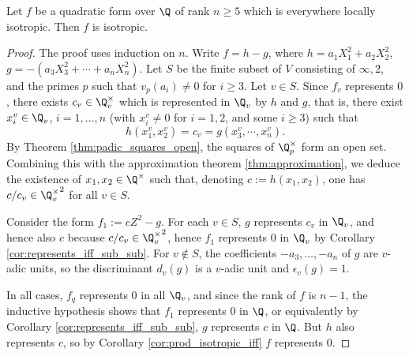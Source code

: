\begin{lemma}\label{lem:isotr_of_five_le_rk}
\leanok
Let $f$ be a quadratic form over $\Q$ of rank $n \ge 5$ which is everywhere locally isotropic. Then $f$ is isotropic.
\end{lemma}
\begin{proof}
The proof uses induction on $n$. Write $f = h - g$, where $h = a_1X_1^2 + a_2X_2^2$, $g = -(a_3X_3^2 + \cdots + a_nX_n^2)$.
Let $S$ be the finite subset of $V$ consisting of $\infty, 2$, and the primes $p$ such that $v_p(a_i) \ne 0$ for $i \ge 3$.
Let $v \in S$. Since $f_v$ represents $0$, there exists $c_v \in \Q_v^\times$ which is represented in $\Q_v$ by $h$ and $g$, that is, there exist $x_i^v \in \Q_v$, $i=1, \dots, n$ (with $x_i^v \ne 0$ for $i=1, 2$, and some $i \ge 3$) such that 
\[ h(x_1^v, x_2^v) = c_v = g(x_3^v, \cdots, x_n^v).\]
By  Theorem \ref{thm:padic_squares_open}, the squares of $\Q_p^\times$ form an open set. Combining this with the approximation theorem \ref{thm:approximation}, we deduce the existence of $x_1, x_2 \in \Q^\times$ such that, denoting $c := h(x_1, x_2)$, one has $c/c_v \in {\Q_v^\times}^2$ for all $v \in S$.

Consider the form $f_1 := cZ^2 - g$. For each $v \in S$, $g$ represents $c_v$ in $\Q_v$, and hence also $c$ because $c/c_v \in {\Q_v^\times}^2$, hence $f_1$ represents $0$ in $\Q_v$ by Corollary \ref{cor:represents_iff_sub_sub}. For $v \notin S$, the coefficients $-a_3, \dots, -a_n$ of $g$ are $v$-adic units, so the discriminant $d_v(g)$ is a $v$-adic unit and $\epsilon_v(g)=1$.

In all cases, $f_q$ represents $0$ in all $\Q_v$, and since the rank of $f$ is $n-1$, the inductive hypothesis shows that $f_1$ represents $0$ in $\Q$, or equivalently by Corollary \ref{cor:represents_iff_sub_sub}, $g$ represents $c$ in $\Q$. But $h$ also represents $c$, so  by Corollary \ref{cor:prod_isotropic_iff} $f$ represents $0$.

\end{proof}